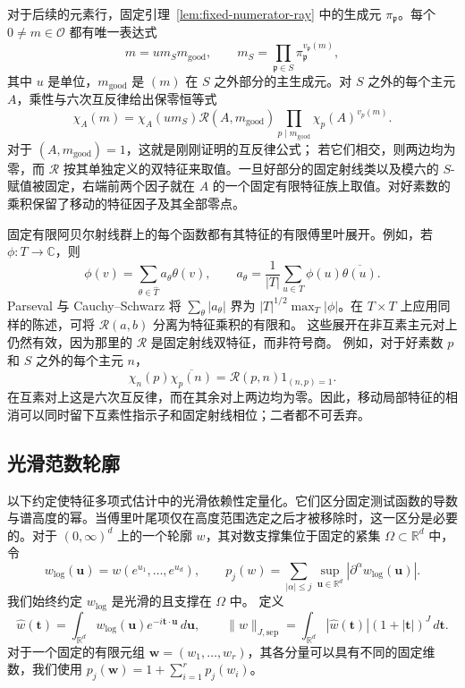 \documentclass[11pt,a4paper]{article}
\numberwithin{equation}{section}
\numberwithin{figure}{section}
\theoremstyle{definition}
\theoremstyle{remark}
\begin{document}
对于后续的元素行，固定引理~\ref{lem:fixed-numerator-ray} 中的生成元 $\pi_{\mathfrak p}$。每个 $0\ne m\in\mathcal O$ 都有唯一表达式
\[
 m=u m_S m_{\mathrm{good}},\qquad
 m_S=\prod_{\mathfrak p\in S}\pi_{\mathfrak p}^{v_{\mathfrak p}(m)},
\]
其中 $u$ 是单位，$m_{\mathrm{good}}$ 是 $(m)$ 在 $S$ 之外部分的主生成元。对 $S$ 之外的每个主元 $A$，乘性与六次互反律给出保零恒等式
\begin{equation}\label{eq:row-fixed-ray-reduction}
 \chi_A(m)=\chi_A(u m_S)\mathcal R(A,m_{\mathrm{good}})
       \prod_{p\mid m_{\mathrm{good}}}\chi_p(A)^{v_p(m)}.
\end{equation}
对于 $(A,m_{\mathrm{good}})=1$，这就是刚刚证明的互反律公式；
若它们相交，则两边均为零，而 $\mathcal R$ 按其单独定义的双特征来取值。一旦好部分的固定射线类以及模六的 $S$-赋值被固定，右端前两个因子就在 $A$ 的一个固定有限特征族上取值。对好素数的乘积保留了移动的特征因子及其全部零点。

固定有限阿贝尔射线群上的每个函数都有其特征的有限傅里叶展开。例如，若 $\phi:T\to\mathbb C$，则
\[
 \phi(v)=\sum_{\theta\in\widehat T}a_\theta\theta(v),\qquad
 a_\theta=\frac1{|T|}\sum_{u\in T}\phi(u)\overline{\theta(u)}.
\]
Parseval 与 Cauchy--Schwarz 将 $\sum_\theta|a_\theta|$ 界为
$|T|^{1/2}\max_T|\phi|$。在 $T\times T$ 上应用同样的陈述，可将 $\mathcal R(a,b)$ 分离为特征乘积的有限和。
这些展开在非互素主元对上仍然有效，因为那里的 $\mathcal R$ 是固定射线双特征，而非符号商。
例如，对于好素数 $p$ 和 $S$ 之外的每个主元 $n$，
\[
 \chi_n(p)\overline{\chi_p(n)}
       =\mathcal R(p,n)1_{(n,p)=1}.
\]
在互素对上这是六次互反律，而在其余对上两边均为零。因此，移动局部特征的相消可以同时留下互素性指示子和固定射线相位；二者都不可丢弃。

\subsection{光滑范数轮廓}

以下约定使特征多项式估计中的光滑依赖性定量化。它们区分固定测试函数的导数与谱高度的幂。当傅里叶尾项仅在高度范围选定之后才被移除时，这一区分是必要的。对于 $(0,\infty)^d$ 上的一个轮廓 $w$，其对数支撑集位于固定的紧集 $\Omega\subset\mathbb R^d$ 中，令
\[
 w_{\log}(\boldsymbol u)=w(e^{u_1},\ldots,e^{u_d}),\qquad
 p_j(w)=\sum_{|\alpha|\le j}\sup_{\boldsymbol u\in\mathbb R^d}
                  |\partial^\alpha w_{\log}(\boldsymbol u)|.
\]
我们始终约定 $w_{\log}$ 是光滑的且支撑在 $\Omega$ 中。
定义
\[
 \widehat w(\boldsymbol t)=\int_{\mathbb R^d}w_{\log}(\boldsymbol u)
                    e^{-i\boldsymbol t\cdot\boldsymbol u}\,d\boldsymbol u,
 \qquad
 \|w\|_{J,\mathrm{sep}}
 =\int_{\mathbb R^d}|\widehat w(\boldsymbol t)|
                    (1+|\boldsymbol t|)^J\,d\boldsymbol t.
\]
对于一个固定的有限元组 $\boldsymbol w=(w_1,\ldots,w_r)$，其各分量可以具有不同的固定维数，我们使用
$p_j(\boldsymbol w)=1+\sum_{i=1}^r p_j(w_i)$。
\end{document}
